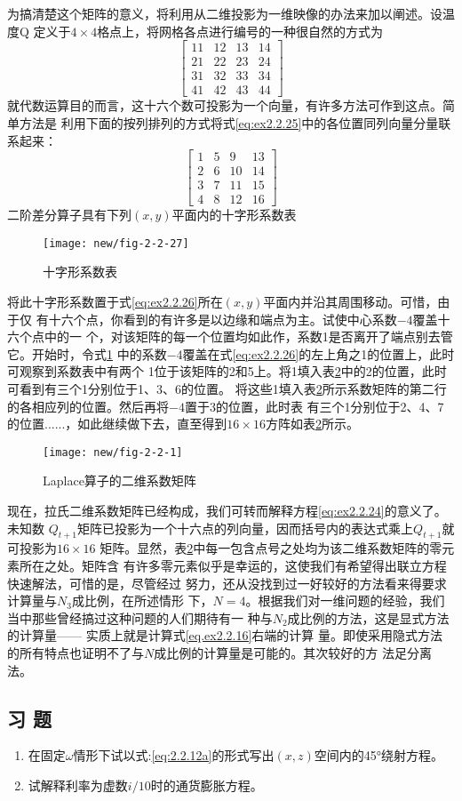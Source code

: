 为搞清楚这个矩阵的意义，将利用从二维投影为一维映像的办法来加以阐述。设温度Q
定义于$4\times 4$格点上，将网格各点进行编号的一种很自然的方式为
\begin{equation}
\begin{bmatrix}
11&12&13&14\\
21&22&23&24\\
31&32&33&34\\
41&42&43&44
\end{bmatrix}
\label{eq:ex2.2.25}
\end{equation}
就代数运算目的而言，这十六个数可投影为一个向量，有许多方法可作到这点。简单方法是
利用下面的按列排列的方式将式\ref{eq:ex2.2.25}中的各位置同列向量分量联系起来：
\begin{equation}
\begin{bmatrix}
1&5&9&13\\
2&6&10&14\\
3&7&11&15\\
4&8&12&16
\end{bmatrix}
\label{eq:ex2.2.26}
\end{equation}
二阶差分算子具有下列$(x,y)$平面内的十字形系数表
\begin{figure}[H]
\centering
\texttt{[image: new/fig-2-2-27]}
\caption[fig-2-2-27]{十字形系数表}
\label{fig:new/fig-2-2-27}
\end{figure}
将此十字形系数置于式\ref{eq:ex2.2.26}所在$(x,y)$平面内并沿其周围移动。可惜，由于仅
有十六个点，你看到的有许多是以边缘和端点为主。试使中心系数$-4$覆盖十六个点中的一
个，对该矩阵的每一个位置均如此作，系数1是否离开了端点别去管它。开始时，令式\ref{fig:new/fig-2-2-27}
中的系数$-4$覆盖在式\ref{eq:ex2.2.26}的左上角之1的位置上，此时可观察到系数表中有两个
1位于该矩阵的2和5上。将1填入表\ref{fig:new/fig-2-2-1}中的2的位置，此时可看到有三个1分别位于1、3、6的位置。
将这些1填入表\ref{fig:new/fig-2-2-1}所示系数矩阵的第二行的各相应列的位置。然后再将$-4$置于3的位置，此时表
有三个1分别位于2、4、7的位置......，如此继续做下去，直至得到$16\times 16$方阵如表\ref{fig:new/fig-2-2-1}所示。
\begin{figure}[H]
\centering
\texttt{[image: new/fig-2-2-1]}
\caption[fig-2-2-1]{Laplace算子的二维系数矩阵}
\label{fig:new/fig-2-2-1}
\end{figure}
现在，拉氏二维系数矩阵已经构成，我们可转而解释方程\ref{eq:ex2.2.24}的意义了。未知数
$Q_{t+1}$矩阵已投影为一个十六点的列向量，因而括号内的表达式乘上$Q_{t+1}$就可投影为$16\times 16$
矩阵。显然，表\ref{fig:new/fig-2-2-1}中每一包含点号之处均为该二维系数矩阵的零元素所在之处。矩阵含
有许多零元素似乎是幸运的，这使我们有希望得出联立方程快速解法，可惜的是，尽管经过
努力，还从没找到过一好较好的方法看来得要求计算量与$N_3$成比例，在所述情形
下，$N = 4$。根据我们对一维问题的经验，我们
当中那些曾经搞过这种问题的人们期待有一
种与$N_2$成比例的方法，这是显式方法的计算量——
实质上就是计算式\ref{eq.ex2.2.16}右端的计算
量。即使采用隐式方法的所有特点也证明不了与$N$成比例的计算量是可能的。其次较好的方
法足分离法。
\subsection{习 题}
\begin{enumerate}
\item 在固定$\omega$情形下试以式:\ref{eq:2.2.12a}的形式写出$(x,z)$空间内的45°绕射方程。
\item 试解释利率为虚数$i/10$时的通货膨胀方程。
\end{enumerate}
